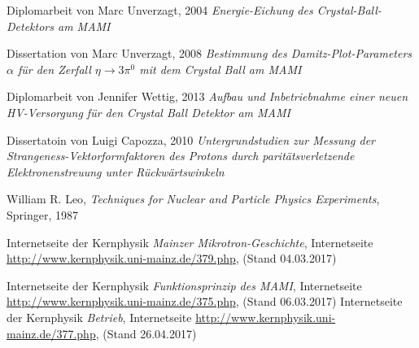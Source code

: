 \documentclass[a4paper,11pt,oneside,final,german,openbib,pdftex]{scrbook}
\begin{document}
{\begin{appendix}



\renewcommand{\bibname}{\bfont Literaturverzeichnis} 

\begin{thebibliography}{99}
	
 Diplomarbeit von Marc Unverzagt, 2004 {\em Energie-Eichung des Crystal-Ball-Detektors am MAMI}

 Dissertation von Marc Unverzagt, 2008 {\em Bestimmung des Damitz-Plot-Parameters $\alpha$ für den Zerfall $ \eta \rightarrow 3\pi^{0} $ mit dem Crystal Ball am MAMI}

 Diplomarbeit von Jennifer Wettig, 2013 {\em Aufbau und Inbetriebnahme einer neuen HV-Versorgung für den Crystal Ball Detektor am MAMI}

 Dissertatoin von Luigi Capozza, 2010 {\em Untergrundstudien zur Messung der
	Strangeness-Vektorformfaktoren
	des Protons durch parit\"atsverletzende
	Elektronenstreuung unter R\"uckw\"artswinkeln}

 William R. Leo, \textit{Techniques for Nuclear and Particle Physics Experiments}, Springer, 1987


 Internetseite der Kernphysik {\em Mainzer Mikrotron-Geschichte}, Internetseite \url{http://www.kernphysik.uni-mainz.de/379.php}, (Stand 04.03.2017)

 Internetseite der Kernphysik {\em Funktionsprinzip des MAMI}, Internetseite \url{http://www.kernphysik.uni-mainz.de/375.php}, (Stand 06.03.2017)
 Internetseite der Kernphysik {\em Betrieb}, Internetseite \url{http://www.kernphysik.uni-mainz.de/377.php}, (Stand 26.04.2017)


\end{thebibliography}
\end{appendix}}
\end{document}
